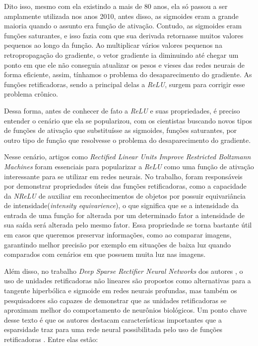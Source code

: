 Dito isso, mesmo com ela existindo a mais de 80 anos, ela só passou a ser amplamente utilizada nos anos 2010, antes disso, as sigmoides eram a grande maioria quando o assunto era função de ativação. Contudo, as sigmoides eram funções saturantes, e isso fazia com que sua derivada retornasse muitos valores pequenos ao longo da função. Ao multiplicar vários valores pequenos na retropropagação do gradiente, o vetor gradiente ia diminuindo até chegar um ponto em que ele não conseguia atualizar os pesos e vieses das redes neurais de forma eficiente, assim, tínhamos o problema do desaparecimento do gradiente. As funções retificadoras, sendo a principal delas a \textit{ReLU}, surgem para corrigir esse problema crônico. 

Dessa forma, antes de conhecer de fato a \textit{ReLU} e suas propriedades, é preciso entender o cenário que ela se popularizou, com os cientistas buscando novos tipos de funções de ativação que substituísse as sigmoides, funções saturantes, por outro tipo de função que resolvesse o problema do desaparecimento do gradiente.

Nesse cenário, artigos como \textit{Rectified Linear Units Improve Restricted Boltzmann Machines} foram essenciais para popularizar a \textit{ReLU} como uma função de ativação interessante para se utilizar em redes neurais. No trabalho, \textcite{Nair2010} foram responsáveis por demonstrar propriedades úteis das funções retificadoras, como a capacidade da \textit{NReLU} de auxiliar em reconhecimentos de objetos por possuir equivariância de intensidade(\textit{intensity equivarience}), o que significa que se a intensidade da entrada de uma função for alterada por um determinado fator a intensidade de sua saída será alterada pelo mesmo fator. Essa propriedade se torna bastante útil em casos que queremos preservar informações, como ao comparar imagens, garantindo melhor precisão por exemplo em situações de baixa luz quando comparados com cenários em que possuem muita luz nas imagens.

Além disso, no trabalho \textit{Deep Sparse Rectifier Neural Networks} dos autores \textcite{Glorot}, o uso de unidades retificadoras não lineares são propostos como alternativas para a tangente hiperbólica e sigmoide em redes neurais profundas, mas também os pesquisadores são capazes de demonstrar que as unidades retificadoras se aproximam melhor do comportamento de neurônios biológicos. Um ponto chave desse texto é que os autores destacam características importantes que a esparsidade traz para uma rede neural possibilitada pelo uso de funções retificadoras \parencite{Glorot}. Entre elas estão:

